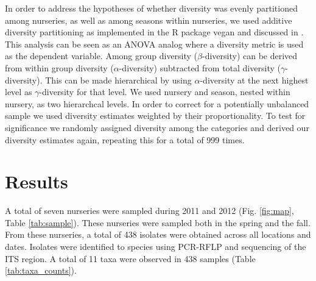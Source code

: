 \documentclass[12pt]{article}
\begin{document}
In order to address the hypotheses of whether diversity was evenly partitioned among nurseries, as well as among seasons within nurseries, we used additive diversity partitioning as implemented in the R package vegan \cite{vegan} and discussed in \cite{lande_1996, christ_etal_2003}.  This analysis can be seen as an ANOVA analog where a diversity metric is used as the dependent variable.  Among group diversity ($\beta$-diversity) can be derived from within group diversity ($\alpha$-diversity) subtracted from total diversity ($\gamma$-diversity).  This can be made hierarchical by using $\alpha$-diversity at the next highest level as $\gamma$-diversity for that level.  We used nursery and season, nested within nursery, as two hierarchcal levels.  In order to correct for a potentially unbalanced sample we used diversity estimates weighted by their proportionality.  To test for significance we randomly assigned diversity among the categories and derived our diversity estimates again, repeating this for a total of 999 times.


\section*{\sffamily\normalsize{Results}}



A total of seven nurseries were sampled during 2011 and 2012 (Fig. \ref{fig:map}, Table \ref{tab:sample}).  These nurseries were sampled both in the spring and the fall.  From these nurseries, a total of 438 isolates were obtained across all locations and dates.  Isolates were identified to species using PCR-RFLP and sequencing of the ITS region. A total of 11 taxa were observed in 438 samples (Table \ref{tab:taxa_counts}).
\end{document}
